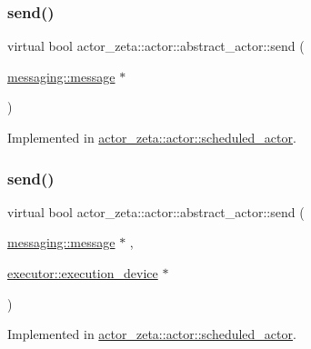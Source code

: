 \subsubsection{\texorpdfstring{send()}{send()}\hspace{0.1cm}{\footnotesize\ttfamily [1/2]}}
{\footnotesize\ttfamily virtual bool actor\+\_\+zeta\+::actor\+::abstract\+\_\+actor\+::send (\begin{DoxyParamCaption}\item[{\hyperlink{classactor__zeta_1_1messaging_1_1message}{messaging\+::message} $\ast$}]{ }\end{DoxyParamCaption})\hspace{0.3cm}{\ttfamily [pure virtual]}}



Implemented in \hyperlink{classactor__zeta_1_1actor_1_1scheduled__actor_acdd757f48a5233a9914209aaf7a2b5ed}{actor\+\_\+zeta\+::actor\+::scheduled\+\_\+actor}.

\mbox{\label{classactor__zeta_1_1actor_1_1abstract__actor_a929d99bea25095035695bad6e6516575}} 
\subsubsection{\texorpdfstring{send()}{send()}\hspace{0.1cm}{\footnotesize\ttfamily [2/2]}}
{\footnotesize\ttfamily virtual bool actor\+\_\+zeta\+::actor\+::abstract\+\_\+actor\+::send (\begin{DoxyParamCaption}\item[{\hyperlink{classactor__zeta_1_1messaging_1_1message}{messaging\+::message} $\ast$}]{,  }\item[{\hyperlink{structactor__zeta_1_1executor_1_1execution__device}{executor\+::execution\+\_\+device} $\ast$}]{ }\end{DoxyParamCaption})\hspace{0.3cm}{\ttfamily [pure virtual]}}



Implemented in \hyperlink{classactor__zeta_1_1actor_1_1scheduled__actor_a223d20f327713fa65968f909aacb0a32}{actor\+\_\+zeta\+::actor\+::scheduled\+\_\+actor}.


